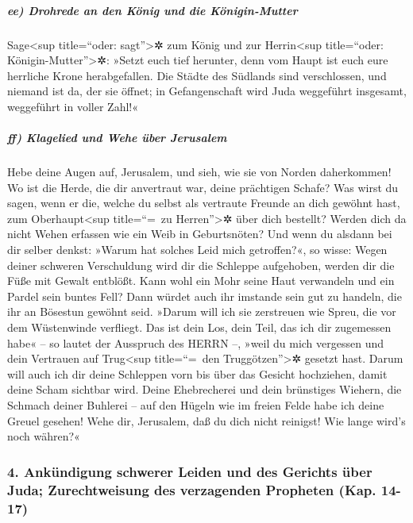 \hypertarget{ee-drohrede-an-den-kuxf6nig-und-die-kuxf6nigin-mutter}{%
\subparagraph{ee) Drohrede an den König und die
Königin-Mutter}\label{ee-drohrede-an-den-kuxf6nig-und-die-kuxf6nigin-mutter}}

Sage\textless sup title=``oder: sagt''\textgreater✲ zum
König und zur Herrin\textless sup title=``oder:
Königin-Mutter''\textgreater✲: »Setzt euch tief herunter, denn vom Haupt
ist euch eure herrliche Krone herabgefallen. Die Städte
des Südlands sind verschlossen, und niemand ist da, der sie öffnet; in
Gefangenschaft wird Juda weggeführt insgesamt, weggeführt in voller
Zahl!«

\hypertarget{ff-klagelied-und-wehe-uxfcber-jerusalem}{%
\subparagraph{ff) Klagelied und Wehe über
Jerusalem}\label{ff-klagelied-und-wehe-uxfcber-jerusalem}}

Hebe deine Augen auf, Jerusalem, und sieh, wie sie von
Norden daherkommen! Wo ist die Herde, die dir anvertraut war, deine
prächtigen Schafe? Was wirst du sagen, wenn er die,
welche du selbst als vertraute Freunde an dich gewöhnt hast, zum
Oberhaupt\textless sup title=``=~zu Herren''\textgreater✲ über dich
bestellt? Werden dich da nicht Wehen erfassen wie ein Weib in
Geburtsnöten? Und wenn du alsdann bei dir selber denkst:
»Warum hat solches Leid mich getroffen?«, so wisse: Wegen deiner
schweren Verschuldung wird dir die Schleppe aufgehoben, werden dir die
Füße mit Gewalt entblößt. Kann wohl ein Mohr seine Haut
verwandeln und ein Pardel sein buntes Fell? Dann würdet auch ihr
imstande sein gut zu handeln, die ihr an Bösestun gewöhnt seid.
»Darum will ich sie zerstreuen wie Spreu, die vor dem
Wüstenwinde verfliegt. Das ist dein Los, dein Teil, das
ich dir zugemessen habe« -- so lautet der Ausspruch des HERRN --, »weil
du mich vergessen und dein Vertrauen auf Trug\textless sup title=``=~den
Truggötzen''\textgreater✲ gesetzt hast. Darum will auch
ich dir deine Schleppen vorn bis über das Gesicht hochziehen, damit
deine Scham sichtbar wird. Deine Ehebrecherei und dein
brünstiges Wiehern, die Schmach deiner Buhlerei -- auf den Hügeln wie im
freien Felde habe ich deine Greuel gesehen! Wehe dir, Jerusalem, daß du
dich nicht reinigst! Wie lange wird's noch währen?«

\hypertarget{ankuxfcndigung-schwerer-leiden-und-des-gerichts-uxfcber-juda-zurechtweisung-des-verzagenden-propheten-kap.-14-17}{%
\subsubsection{4. Ankündigung schwerer Leiden und des Gerichts über
Juda; Zurechtweisung des verzagenden Propheten (Kap.
14-17)}\label{ankuxfcndigung-schwerer-leiden-und-des-gerichts-uxfcber-juda-zurechtweisung-des-verzagenden-propheten-kap.-14-17}}

